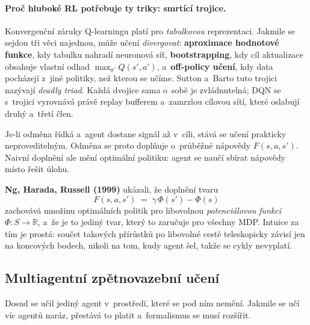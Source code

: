 \documentclass[11pt,a4paper]{article}
\theoremstyle{definition}
\begin{document}
\paragraph{Proč hluboké RL potřebuje ty triky: smrtící trojice.} Konvergenční záruky
Q-learningu platí pro \emph{tabulkovou} reprezentaci. Jakmile se sejdou tři věci najednou,
může učení \emph{divergovat}: \textbf{aproximace hodnotové funkce}, kdy tabulku nahradí
neuronová síť, \textbf{bootstrapping}, kdy cíl aktualizace obsahuje vlastní odhad
$\max_{a'} Q(s',a')$, a~\textbf{off-policy učení}, kdy data pocházejí z~jiné politiky, než
kterou se učíme. Sutton a~Barto tuto trojici nazývají \emph{deadly triad}. Každá dvojice sama
o~sobě je zvládnutelná; DQN se s~trojicí vyrovnává právě replay bufferem a~zamrzlou cílovou
sítí, které oslabují druhý a~třetí člen.

\begin{defbox}
Je-li odměna řídká a~agent dostane signál až v~cíli, stává se učení prakticky neproveditelným.
Odměna se proto doplňuje o~průběžné nápovědy $F(s,a,s')$. Naivní doplnění ale mění optimální
politiku: agent se naučí sbírat nápovědy místo řešit úlohu.

\textbf{Ng, Harada, Russell (1999)} ukázali, že doplnění tvaru
\[
F(s,a,s') \;=\; \gamma\,\Phi(s') - \Phi(s)
\]
zachovává množinu optimálních politik pro libovolnou \emph{potenciálovou funkci}
$\Phi : S \to \mathbb{R}$, a~že je to jediný tvar, který to zaručuje pro všechny MDP.
Intuice za tím je prostá: součet takových přírůstků po libovolné cestě teleskopicky závisí
jen na koncových bodech, nikoli na tom, kudy agent šel, takže se cykly nevyplatí.
\end{defbox}

\subsection{Multiagentní zpětnovazební učení}

Dosud se učil jediný agent v~prostředí, které se pod ním nemění. Jakmile se učí víc agentů
naráz, přestává to platit a~formalismus se musí rozšířit.
\end{document}
